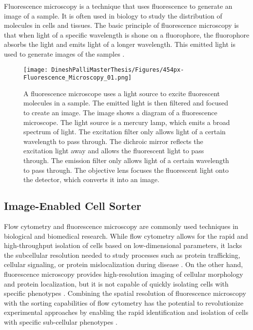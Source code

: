 \documentclass[12pt,a4paper]{article}
\begin{document}
Fluorescence microscopy is a technique that uses fluorescence to generate an image of a sample. It is often used in biology to study the distribution of molecules in cells and tissues. The basic principle of fluorescence microscopy is that when light of a specific wavelength is shone on a fluorophore, the fluorophore absorbs the light and emits light of a longer wavelength. This emitted light is used to generate images of the samples \cite{sanderson_smith_parker_bootman_2014}.

\begin{figure}
  \centering
  \texttt{[image: DineshPalliMasterThesis/Figures/454px-Fluorescence\_Microscopy\_01.png]}
  \caption{A fluorescence microscope uses a light source to excite fluorescent molecules in a sample. The emitted light is then filtered and focused to create an image. The image shows a diagram of a fluorescence microscope. The light source is a mercury lamp, which emits a broad spectrum of light. The excitation filter only allows light of a certain wavelength to pass through. The dichroic mirror reflects the excitation light away and allows the fluorescent light to pass through. The emission filter only allows light of a certain wavelength to pass through. The objective lens focuses the fluorescent light onto the detector, which converts it into an image. \cite{File:Fluorescence Microscopy 01.png - Biology Wiki}}
  \label{fluorescencemicroscopy}
\end{figure}


\subsection{Image-Enabled Cell Sorter}
Flow cytometry and fluorescence microscopy are commonly used techniques in biological and biomedical research. While flow cytometry allows for the rapid and high-throughput isolation of cells based on low-dimensional parameters, it lacks the subcellular resolution needed to study processes such as protein trafficking, cellular signaling, or protein mislocalization during disease \cite{cossarizza_chang_radbruch_acs_adam_adamklages_agace_aghaeepour_akdis_allez_et_al._2019}. On the other hand, fluorescence microscopy provides high-resolution imaging of cellular morphology and protein localization, but it is not capable of quickly isolating cells with specific phenotypes \cite{Espina2006-iv}. Combining the spatial resolution of fluorescence microscopy with the sorting capabilities of flow cytometry has the potential to revolutionize experimental approaches by enabling the rapid identification and isolation of cells with specific sub-cellular phenotypes \cite{doi:10.1126/science.abj3013}.
\end{document}
